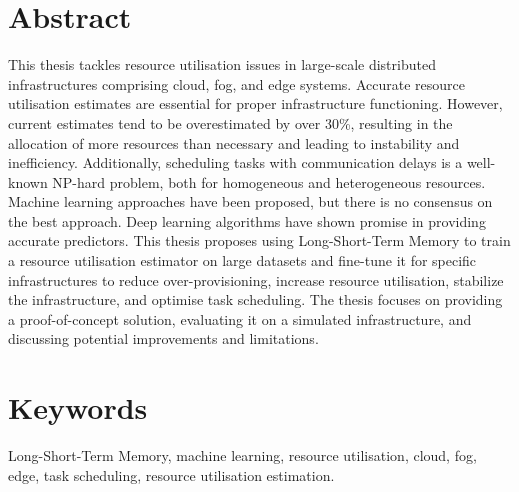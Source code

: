 \section*{Abstract}
  \label{sec:abstract}

This thesis tackles resource utilisation issues in large-scale distributed infrastructures comprising cloud, fog, and edge systems. Accurate resource utilisation estimates are essential for proper infrastructure functioning. However, current estimates tend to be overestimated by over 30\%, resulting in the allocation of more resources than necessary and leading to instability and inefficiency. Additionally, scheduling tasks with communication delays is a well-known NP-hard problem, both for homogeneous and heterogeneous resources. Machine learning approaches have been proposed, but there is no consensus on the best approach. Deep learning algorithms have shown promise in providing accurate predictors. This thesis proposes using Long-Short-Term Memory to train a resource utilisation estimator on large datasets and fine-tune it for specific infrastructures to reduce over-provisioning, increase resource utilisation, stabilize the infrastructure, and optimise task scheduling. The thesis focuses on providing a proof-of-concept solution, evaluating it on a simulated infrastructure, and discussing potential improvements and limitations. 


\section*{Keywords}
\label{sec:keywords}
Long-Short-Term Memory, machine learning, resource utilisation, cloud, fog, edge,  task scheduling, resource utilisation estimation.
